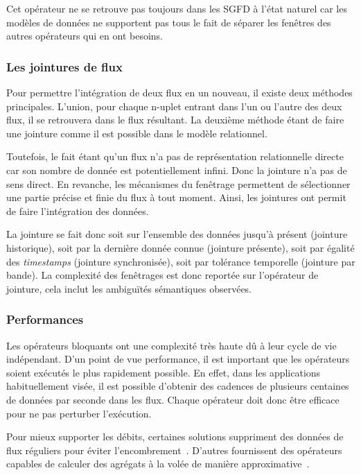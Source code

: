 Cet opérateur ne se retrouve pas toujours dans les SGFD à l'état naturel car les modèles de données ne supportent pas tous le fait de séparer les fenêtres des autres opérateurs qui en ont besoins.

\subsubsection{Les jointures de flux}
Pour permettre l'intégration de deux flux en un nouveau, il existe deux méthodes principales. L'union, pour chaque n-uplet entrant dans l'un ou l'autre des deux flux, il se retrouvera dans le flux résultant. La deuxième méthode étant de faire une jointure comme il est possible dans le modèle relationnel.

Toutefois, le fait étant qu'un flux n'a pas de représentation relationnelle directe car son nombre de donnée est potentiellement infini. Donc la jointure n'a pas de sens direct. En revanche, les mécanismes du fenêtrage permettent de sélectionner une partie précise et finie du flux à tout moment. Ainsi, les jointures ont permit de faire l'intégration des données.

La jointure se fait donc soit sur l'ensemble des données jusqu'à présent (jointure historique), soit par la dernière donnée connue (jointure présente), soit par égalité des \textit{timestamps} (jointure synchronisée), soit par tolérance temporelle (jointure par bande). La complexité des fenêtrages est donc reportée sur l'opérateur de jointure, cela inclut les ambiguïtés sémantiques observées.

\subsubsection{Performances}
Les opérateurs bloquants ont une complexité très haute dû à leur cycle de vie indépendant. D'un point de vue performance, il est important que les opérateurs soient exécutés le plus rapidement possible. En effet, dans les applications habituellement visée, il est possible d'obtenir des cadences de plusieurs centaines de données par seconde dans les flux. Chaque opérateur doit donc être efficace pour ne pas perturber l'exécution.

Pour mieux supporter les débits, certaines solutions suppriment des données de flux réguliers pour éviter l'encombrement~\cite{Tatbul:load-shedding}. D'autres fournissent des opérateurs capables de calculer des agrégats à la volée de manière approximative~\cite{Babcock:sampling}.


